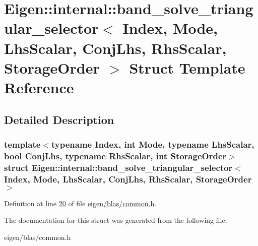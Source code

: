 \hypertarget{struct_eigen_1_1internal_1_1band__solve__triangular__selector}{}\section{Eigen\+:\+:internal\+:\+:band\+\_\+solve\+\_\+triangular\+\_\+selector$<$ Index, Mode, Lhs\+Scalar, Conj\+Lhs, Rhs\+Scalar, Storage\+Order $>$ Struct Template Reference}
\label{struct_eigen_1_1internal_1_1band__solve__triangular__selector}


\subsection{Detailed Description}
\subsubsection*{template$<$typename Index, int Mode, typename Lhs\+Scalar, bool Conj\+Lhs, typename Rhs\+Scalar, int Storage\+Order$>$\newline
struct Eigen\+::internal\+::band\+\_\+solve\+\_\+triangular\+\_\+selector$<$ Index, Mode, Lhs\+Scalar, Conj\+Lhs, Rhs\+Scalar, Storage\+Order $>$}



Definition at line \hyperlink{eigen_2blas_2common_8h_source_l00020}{20} of file \hyperlink{eigen_2blas_2common_8h_source}{eigen/blas/common.\+h}.



The documentation for this struct was generated from the following file\+:\begin{DoxyCompactItemize}
\item 
eigen/blas/common.\+h\end{DoxyCompactItemize}
